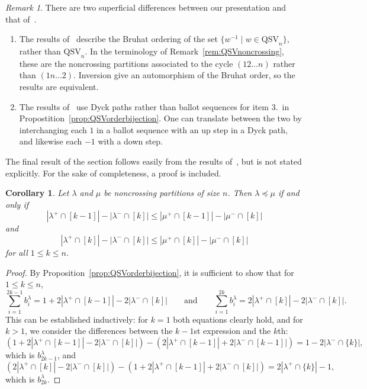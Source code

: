 \documentclass[12pt]{amsart}
\newtheorem{cor}[equation]{Corollary}
\theoremstyle{definition}
\theoremstyle{remark}
\newtheorem{rem}[equation]{Remark}
\numberwithin{equation}{section}
\newcommand{\QSV}{\mathrm{QSV}}
\begin{document}
\begin{rem}
There are two superficial differences between our presentation and that of~\cite{GobetWilliams}.
\begin{enumerate}
\item The results of~\cite{GobetWilliams} describe the Bruhat ordering of the set $\{w^{-1} \;|\; w \in \QSV_{n}\}$, rather than $\QSV_{n}$.  
In the terminology of Remark~\ref{rem:QSVnoncrossing}, these are the noncrossing partitions associated to the cycle $(12\ldots n)$ rather than $(1n\ldots 2)$.  
Inversion give an automorphism of the Bruhat order, so the results are equivalent.

\item The results of~\cite{GobetWilliams} use Dyck paths rather than ballot sequences for item 3.~in Propostition~\ref{prop:QSVorderbijection}.  
One can translate between the two by interchanging each $1$ in a ballot sequence with an up step in a Dyck path, and likewise each $-1$ with a down step.

\end{enumerate}
%
%
\end{rem}

The final result of the section follows easily from the results of~\cite{GobetWilliams}, but is not stated explicitly.  For the sake of completeness, a proof is included.

\begin{cor}
\label{cor:bruhatncphelper}
Let $\lambda$ and $\mu$ be noncrossing partitions of size $n$.  Then $\lambda \preceq \mu$ if and only if 
\[
|\lambda^{+} \cap [k-1]| - |\lambda^{-} \cap [k]| \le |\mu^{+} \cap [k-1]| - |\mu^{-} \cap [k]|
\]
and
\[
|\lambda^{+} \cap [k]| - |\lambda^{-} \cap [k]| \le |\mu^{+} \cap [k]| - |\mu^{-} \cap [k]| 
\]
for all $1 \le k \le n$.
\end{cor}
\begin{proof}
By Proposition~\ref{prop:QSVorderbijection}, it is sufficient to show that for $1 \le k \le n$,
\[
\sum_{i = 1}^{2k - 1} b^{\lambda}_{i}  = 1 + 2|\lambda^{+} \cap [k-1]| - 2|\lambda^{-} \cap [k]|
\qquad\text{and}\qquad
\sum_{i = 1}^{2k} b^{\lambda}_{i}  = 2|\lambda^{+} \cap [k]| - 2|\lambda^{-} \cap [k]|.
\] 
This can be established inductively: for $k = 1$ both equations clearly hold, and for $k > 1$, we consider the differences between the $k-1$st expression and the $k$th: 
\[
(1 + 2|\lambda^{+} \cap [k-1]| - 2|\lambda^{-} \cap [k]|) - (2|\lambda^{+} \cap [k-1]| + 2|\lambda^{-} \cap [k-1]|)
= 1 - 2|\lambda^{-} \cap \{k\}|,
\]
which is $b^{\lambda}_{2k-1}$, and 
\[
(2|\lambda^{+} \cap [k]| - 2|\lambda^{-} \cap [k]|) - (1 + 2|\lambda^{+} \cap [k-1]| + 2|\lambda^{-} \cap [k]|) = 2|\lambda^{+} \cap \{k\}| - 1,
\]
which is $b^{\lambda}_{2k}$.
\end{proof}
\end{document}
